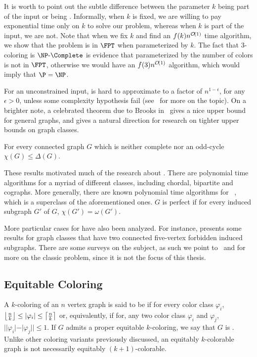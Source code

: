 It is worth to point out the subtle difference between the parameter $k$ being part of the input or being .
Informally, when $k$ is fixed, we are willing to pay exponential time only on $k$ to solve our problem, whereas when $k$ is part of the input, we are not.
Note that when we fix $k$ and find an $f(k)n^{\mathcal{O}\!\left(1\right)}$ time algorithm, we show that the problem is in $\FPT$ when parameterized by $k$.
The fact that $3$-coloring is $\NPc$ is evidence that  parameterized by the number of colors is not in $\FPT$, otherwise we would have an $f(3)n^{\mathcal{O}\!\left(1\right)}$ algorithm, which would imply that $\P = \NP$. 

For an unconstrained input,  is hard to approximate to a factor of $n^{1-\epsilon}$, for any $\epsilon > 0$, unless some complexity hypothesis fail (see~\citep{color_zpp} for more on the topic).
On a brighter note, a celebrated theorem due to Brooks in~\citep{brooks_theorem} gives a nice upper bound for general graphs, and gives a natural direction for research on tighter upper bounds on graph classes.

\begin{theorem*}
    For every connected graph $G$ which is neither complete nor an odd-cycle $\chi(G) \leq \Delta(G)$.
\end{theorem*}

These results motivated much of the research about .
There are polynomial time algorithms for a myriad of different classes, including chordal, bipartite and cographs.
More generally, there are known polynomial time algorithms for ~\citep{perfect_polynomial}, which is a superclass of the aforementioned ones.
$G$ is perfect if for every induced subgraph $G'$ of $G$, $\chi(G') = \omega(G')$.

More particular cases for  have also been analyzed. For instance, \citep{coloring_art} presents some results for graph classes that have two connected five-vertex forbidden induced subgraphs. There are some surveys on the subject, as such we point to~\citep{coloring_survey} and \citep{coloring_survey2} for more on the classic  problem, since it is not the focus of this thesis.


\subsection{Equitable Coloring}
A $k$-coloring of an $n$ vertex graph is said to be  if for every color class $\varphi_i$, $\left\lfloor\frac{n}{k}\right\rfloor \leq |\varphi_i| \leq \left\lceil\frac{n}{k}\right\rceil$ or, equivalently, if for, any two color class $\varphi_i$ and $\varphi_j$, $||\varphi_i| - |\varphi_j|| \leq 1$.
If $G$ admits a proper equitable $k$-coloring, we say that $G$ is .
Unlike other coloring variants previously discussed, an equitably $k$-colorable graph is not necessarily equitably $(k+1)$-colorable.

